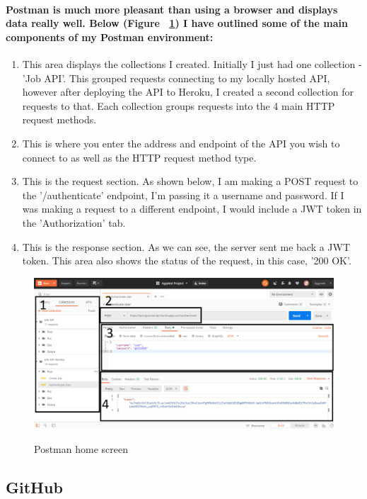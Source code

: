 \paragraph{Postman is much more pleasant than using a browser and displays data really well. Below (Figure ~\ref{postman_label}) I have outlined some of the main components of my Postman environment:}
\begin{enumerate}
    \item This area displays  the collections I created. Initially I just had one collection - 'Job API'. This grouped requests connecting to my locally hosted API, however after deploying the API to Heroku, I created a second collection for requests to that. Each collection groups requests into the 4 main HTTP request methods.
    \item This is where you enter the address and endpoint of the API you wish to connect to as well as the HTTP request method type.
    \item This is the request section. As shown below, I am making a POST request to the '/authenticate' endpoint, I'm passing it a username and password. If I was making a request to a different endpoint, I would include a JWT token in the 'Authorization' tab.
    \item This is the response section. As we can see, the server sent me back a JWT token. This area also shows the status of the request, in this case, '200 OK'. 
\end{enumerate}
\begin{figure}[ht]
    \centering
    \includegraphics[scale=0.3]{Images/postman.png} 
    \label{postman_label}
    \caption{Postman home screen}
\end{figure}

\subsection{GitHub}
